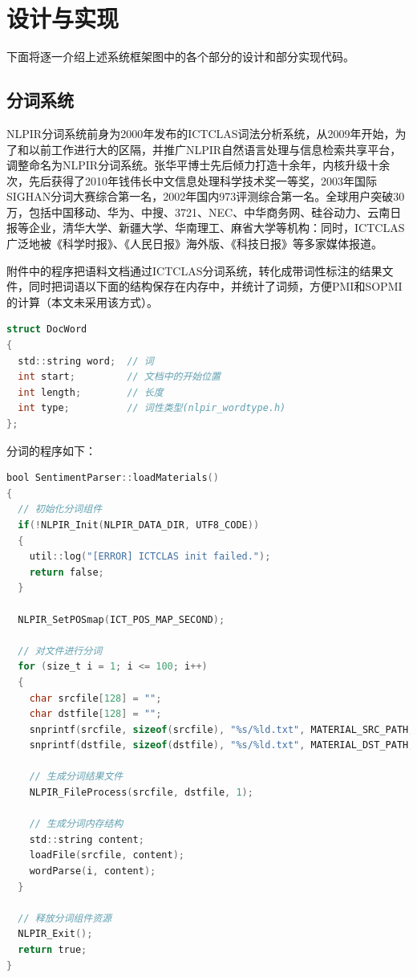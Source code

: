 \documentclass[11pt,a4paper]{article}
\begin{document}
\clearpage

\section{设计与实现}

下面将逐一介绍上述系统框架图中的各个部分的设计和部分实现代码。

\subsection{分词系统}

NLPIR分词系统前身为2000年发布的ICTCLAS词法分析系统，从2009年开始，为了和以前工作进行大的区隔，并推广NLPIR自然语言处理与信息检索共享平台，调整命名为NLPIR分词系统。张华平博士先后倾力打造十余年，内核升级十余次，先后获得了2010年钱伟长中文信息处理科学技术奖一等奖，2003年国际SIGHAN分词大赛综合第一名，2002年国内973评测综合第一名。全球用户突破30万，包括中国移动、华为、中搜、3721、NEC、中华商务网、硅谷动力、云南日报等企业，清华大学、新疆大学、华南理工、麻省大学等机构：同时，ICTCLAS广泛地被《科学时报》、《人民日报》海外版、《科技日报》等多家媒体报道。

附件中的程序把语料文档通过ICTCLAS分词系统，转化成带词性标注的结果文件，同时把词语以下面的结构保存在内存中，并统计了词频，方便PMI和SOPMI的计算（本文未采用该方式）。\vspace{6pt}

{\scriptsize\begin{lstlisting}[language=C] 
struct DocWord
{
  std::string word;  // 词
  int start;         // 文档中的开始位置
  int length;        // 长度
  int type;          // 词性类型(nlpir_wordtype.h)
};
\end{lstlisting}}

分词的程序如下：\vspace{6pt}

{\scriptsize\begin{lstlisting}[language=C] 
bool SentimentParser::loadMaterials()
{
  // 初始化分词组件
  if(!NLPIR_Init(NLPIR_DATA_DIR, UTF8_CODE))
  {
    util::log("[ERROR] ICTCLAS init failed.");
    return false;
  }

  NLPIR_SetPOSmap(ICT_POS_MAP_SECOND);
 
  // 对文件进行分词
  for (size_t i = 1; i <= 100; i++)
  {
    char srcfile[128] = "";
    char dstfile[128] = "";
    snprintf(srcfile, sizeof(srcfile), "%s/%ld.txt", MATERIAL_SRC_PATH, i);
    snprintf(dstfile, sizeof(dstfile), "%s/%ld.txt", MATERIAL_DST_PATH, i);

    // 生成分词结果文件
    NLPIR_FileProcess(srcfile, dstfile, 1);

    // 生成分词内存结构
    std::string content;
    loadFile(srcfile, content);
    wordParse(i, content);
  }

  // 释放分词组件资源
  NLPIR_Exit();
  return true;
}
\end{lstlisting}}
\end{document}
